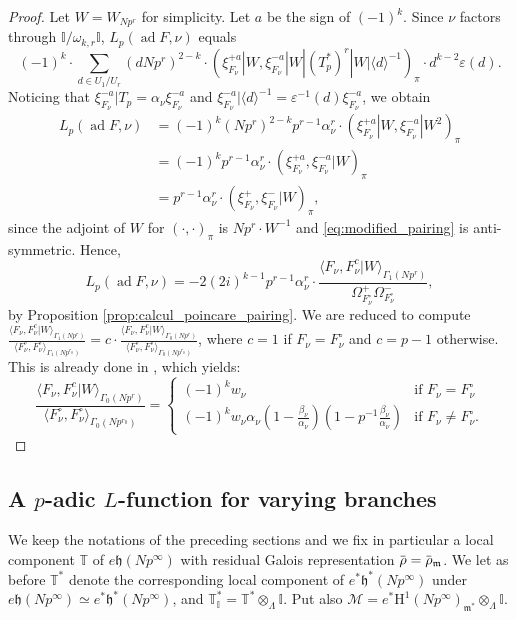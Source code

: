\documentclass[12pt]{amsart}
\newcommand\bI{\mathbb{I}}
\newcommand\bT{\mathbb{T}}
\newcommand\cM{\mathcal{M}}
\newcommand\gh{\mathfrak{h}}
\newcommand\gm{\mathfrak{m}}
\newcommand{\ob}[1]{\mkern 1.5mu\overline{\mkern-1.5mu#1\mkern-1.5mu}\mkern 1.5mu}
\DeclareMathOperator{\ad}{ad}
\newcommand{\HH}{\mathrm{H}}
\theoremstyle{defstyle}
\theoremstyle{thmstyle}
\begin{document}
\begin{proof}
	Let $W=W_{Np^r}$ for simplicity. Let $a$ be the sign of $(-1)^k$. Since $\nu$ factors through $\bI/\omega_{k,r}\bI$, $L_p(\ad F,\nu)$ equals
\[(-1)^{k}\cdot \sum_{d\in U_1/U_r} (dNp^r)^{2-k}\cdot (\xi_{F_\nu}^{+a}|W,\xi_{F_\nu}^{-a}|W|(T_p^*)^r|W|\langle d \rangle^{-1})_\pi \cdot d^{k-2}\varepsilon(d).\]
Noticing that $\xi_{F_\nu}^{-a}|T_p=\alpha_\nu\xi_{F_\nu}^{-a}$ and $\xi_{F_\nu}^{-a}|\langle d\rangle^{-1}=\varepsilon^{-1}(d)\xi_{F_\nu}^{-a}$, we obtain 
\begin{align*}
	L_p(\ad F,\nu)&= (-1)^{k}(Np^r)^{2-k} p^{r-1}\alpha_\nu^r\cdot (\xi_{F_\nu}^{+a}|W,\xi_{F_\nu}^{-a}|W^2)_\pi \\
					&= (-1)^{k} p^{r-1}\alpha_\nu^r\cdot (\xi_{F_\nu}^{+a},\xi_{F_\nu}^{-a}|W)_\pi \\
					&= p^{r-1}\alpha_\nu^r\cdot (\xi_{F_\nu}^{+},\xi_{F_\nu}^{-}|W)_\pi,
\end{align*}
since the adjoint of $W$ for $(\cdot,\cdot)_\pi$ is $Np^r\cdot W^{-1}$ and \eqref{eq:modified_pairing} is anti-symmetric. Hence, 
\[	L_p(\ad F,\nu)= -2(2i)^{k-1} p^{r-1}\alpha_\nu^r\cdot \dfrac{\langle F_\nu,F^c_\nu|W\rangle_{\Gamma_1(Np^r)}}{\Omega^+_{F^\circ_\nu}\Omega^-_{F^\circ_\nu}},\]
by Proposition \ref{prop:calcul_poincare_pairing}. We are reduced to compute $\frac{\langle F_\nu,F^c_\nu|W\rangle_{\Gamma_1(Np^r)}}{\langle F^\circ_\nu,F^\circ_\nu\rangle_{\Gamma_1(Np^{r_0})}}=c\cdot\frac{\langle F_\nu,F^c_\nu|W\rangle_{\Gamma_0(Np^r)}}{\langle F^\circ_\nu,F^\circ_\nu\rangle_{\Gamma_0(Np^{r_0})}}$, where $c=1$ if $F_\nu=F_\nu^\circ$ and $c=p-1$ otherwise. This is already done in \cite[(9.5) p.79]{hidaAIF}, which yields:
\begin{equation*}
	\frac{\langle F_\nu,F^c_\nu|W\rangle_{\Gamma_0(Np^r)}}{\langle F^\circ_\nu,F^\circ_\nu\rangle_{\Gamma_0(Np^{r_0})}}=
	\left\{\begin{array}{ll}
		(-1)^kw_\nu  &\textrm{if $F_\nu=F_\nu^\circ$}\\
	(-1)^kw_\nu \alpha_\nu(1-\frac{\beta_\nu}{\alpha_\nu})(1-p^{-1}\frac{\beta_\nu}{\alpha_\nu})  &\textrm{if $F_\nu\neq F_\nu^\circ$}.
	\end{array}\right.
\end{equation*}
\end{proof}

\subsection{A $p$-adic $L$-function for varying branches}
We keep the notations of the preceding sections and we fix in particular a local component $\bT$ of $e\gh(Np^\infty)$ with residual Galois representation $\ob{\rho}=\ob{\rho}_\gm$. We let as before $\bT^*$ denote the corresponding local component of $e^*\gh^*(Np^\infty)$ under $e\gh(Np^\infty)\simeq e^*\gh^*(Np^\infty)$, and $\bT^*_\bI=\bT^*\otimes_{\Lambda}\bI$. Put also  $\cM=e^*\HH^1(Np^\infty)_{\gm^*}\otimes_{\Lambda}\bI$.
\end{document}
